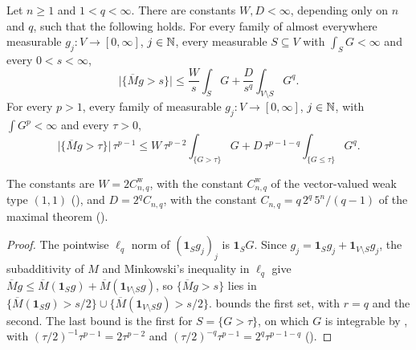 \begin{lemma}
\label{lem:fefferman-stein-split}
\leanok
{}
Let $n \geq 1$ and $1 < q < \infty$. There are constants $W, D < \infty$, depending only on $n$
and $q$, such that the following holds. For every family of almost everywhere measurable
$g_j : V \to [0, \infty]$, $j \in \mathbb{N}$, every measurable $S \subseteq V$ with
$\int_S G < \infty$ and every $0 < s < \infty$,
\[
  \bigl|\{\overline M g > s\}\bigr|
  \leq \frac{W}{s} \int_S G + \frac{D}{s^q} \int_{V \setminus S} G^q .
\]
For every $p > 1$, every family of measurable
$g_j : V \to [0, \infty]$, $j \in \mathbb{N}$, with $\int G^p < \infty$ and every $\tau > 0$,
\[
  \bigl|\{\overline M g > \tau\}\bigr| \, \tau^{p-1}
  \leq W \, \tau^{p-2} \int_{\{G > \tau\}} G
    + D \, \tau^{p-1-q} \int_{\{G \leq \tau\}} G^q .
\]
\end{lemma}

The constants are $W = 2 C^{\mathrm w}_{n,q}$, with the constant $C^{\mathrm w}_{n,q}$ of the
vector-valued weak type $(1,1)$ (), and $D = 2^q C_{n,q}$, with the
constant $C_{n,q} = q \, 2^q \, 5^n / (q - 1)$ of the maximal theorem
().

\begin{proof}
\leanok
{}
The pointwise $\ell_q$ norm of $(\mathbf 1_S g_j)_j$ is $\mathbf 1_S G$. Since
$g_j = \mathbf 1_S g_j + \mathbf 1_{V \setminus S} g_j$, the subadditivity of $M$ and
Minkowski's inequality in $\ell_q$ give
$\overline M g \leq \overline M(\mathbf 1_S g) + \overline M(\mathbf 1_{V \setminus S} g)$, so
$\{\overline M g > s\}$ lies in
$\{\overline M(\mathbf 1_S g) > s/2\} \cup \{\overline M(\mathbf 1_{V \setminus S} g) > s/2\}$.
 bounds the first set,  with $r = q$ and
 the second. The last bound is the first for
$S = \{G > \tau\}$, on which $G$ is integrable by , with
$(\tau/2)^{-1} \tau^{p-1} = 2 \tau^{p-2}$ and $(\tau/2)^{-q} \tau^{p-1} = 2^q \tau^{p-1-q}$
().
\end{proof}


